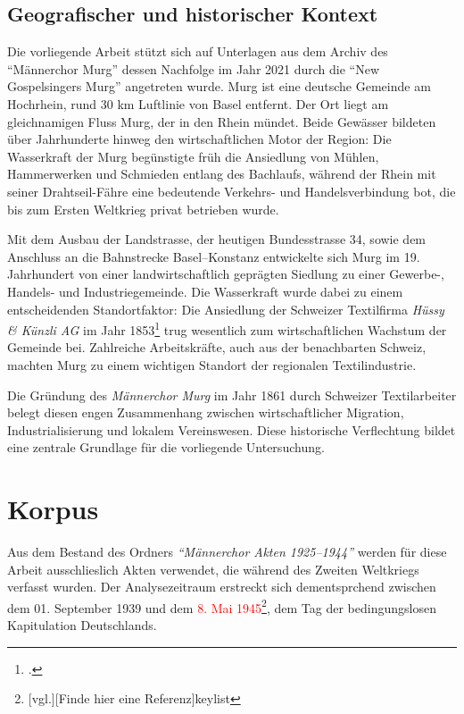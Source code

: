 \documentclass[12pt, a4paper, ngerman, bidi=default]{article}
\let\cite\footcite
\begin{document}
\subsection{Geografischer und historischer Kontext}
Die vorliegende Arbeit stützt sich auf Unterlagen aus dem Archiv des \enquote{Männerchor Murg} dessen Nachfolge im Jahr 2021 durch die \enquote{New Gospelsingers Murg} angetreten wurde. Murg ist eine deutsche Gemeinde am Hochrhein, rund 30 km Luftlinie von Basel entfernt. Der Ort liegt am gleichnamigen Fluss Murg, der in den Rhein mündet. Beide Gewässer bildeten über Jahrhunderte hinweg den wirtschaftlichen Motor der Region: Die Wasserkraft der Murg begünstigte früh die Ansiedlung von Mühlen, Hammerwerken und Schmieden entlang des Bachlaufs, während der Rhein mit seiner Drahtseil-Fähre eine bedeutende Verkehrs- und Handelsverbindung bot, die bis zum Ersten Weltkrieg privat betrieben wurde.

Mit dem Ausbau der Landstrasse, der heutigen Bundesstrasse 34, sowie dem Anschluss an die Bahnstrecke Basel–Konstanz entwickelte sich Murg im 19. Jahrhundert von einer landwirtschaftlich geprägten Siedlung zu einer Gewerbe-, Handels- und Industriegemeinde. Die Wasserkraft wurde dabei zu einem entscheidenden Standortfaktor: Die Ansiedlung der Schweizer Textilfirma \textit{Hüssy \& Künzli AG} im Jahr 1853\cite[vgl.][]{gemeinde_murg_geschichte_nodate} trug wesentlich zum wirtschaftlichen Wachstum der Gemeinde bei. Zahlreiche Arbeitskräfte, auch aus der benachbarten Schweiz, machten Murg zu einem wichtigen Standort der regionalen Textilindustrie.

Die Gründung des \textit{Männerchor Murg} im Jahr 1861 durch Schweizer Textilarbeiter belegt diesen engen Zusammenhang zwischen wirtschaftlicher Migration, Industrialisierung und lokalem Vereinswesen. Diese historische Verflechtung bildet eine zentrale Grundlage für die vorliegende Untersuchung.


  

\newpage

\section{Korpus}
Aus dem Bestand des Ordners \textit{``Männerchor Akten 1925--1944''} werden für diese Arbeit ausschlieslich Akten verwendet, 
die während des Zweiten Weltkriegs verfasst wurden. Der Analysezeitraum erstreckt sich dementsprchend zwischen dem 01. September 1939 
und dem \textcolor{red}{8. Mai 1945}\footnote{[vgl.][Finde hier eine Referenz]{keylist}}, dem Tag der bedingungslosen Kapitulation Deutschlands.
\end{document}
